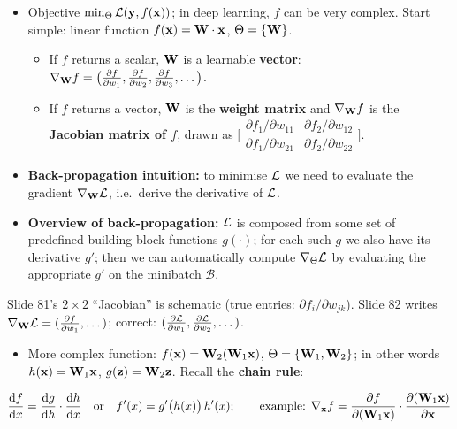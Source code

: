 \begin{itemize}
  \item Objective $\min_\Theta\mathcal{L}(\mathbf{y},f(\mathbf{x}))$; in deep learning, $f$ can be
    very complex. Start simple: linear function $f(\mathbf{x})=\mathbf{W}\cdot\mathbf{x}$,
    $\Theta=\{\mathbf{W}\}$.
    \begin{itemize}
      \item If $f$ returns a scalar, $\mathbf{W}$ is a learnable \textbf{vector}:
        $\nabla_{\mathbf{W}} f=\bigl(\frac{\partial f}{\partial w_1},\frac{\partial f}{\partial w_2},\frac{\partial f}{\partial w_3},\dots\bigr)$.
      \item If $f$ returns a vector, $\mathbf{W}$ is the \textbf{weight matrix} and
        $\nabla_{\mathbf{W}} f$ is the \textbf{Jacobian matrix of $f$}, drawn as
        $\bigl[\begin{smallmatrix}\partial f_1/\partial w_{11} & \partial f_2/\partial w_{12}\\
        \partial f_1/\partial w_{21} & \partial f_2/\partial w_{22}\end{smallmatrix}\bigr]$.
    \end{itemize}
  \item \textbf{Back-propagation intuition:} to minimise $\mathcal{L}$ we need to
    evaluate the gradient $\nabla_{\mathbf{W}}\mathcal{L}$, i.e.\ derive the derivative of
    $\mathcal{L}$.
  \item \textbf{Overview of back-propagation:} $\mathcal{L}$ is composed from some set
    of predefined building block functions $g(\cdot)$; for each such $g$ we also
    have its derivative $g'$; then we can automatically compute
    $\nabla_\Theta\mathcal{L}$ by evaluating the appropriate $g'$ on the minibatch
    $\mathcal{B}$.
\end{itemize}
\begin{caution}
  Slide 81's $2\times2$ ``Jacobian'' is schematic (true entries: $\partial f_i/\partial w_{jk}$).
  Slide 82 writes $\nabla_{\mathbf{W}}\mathcal{L}=(\frac{\partial f}{\partial w_1},\dots)$; correct: $(\frac{\partial\mathcal{L}}{\partial w_1},\frac{\partial\mathcal{L}}{\partial w_2},\dots)$.
\end{caution}
\begin{itemize}
  \item More complex function: $f(\mathbf{x})=\mathbf{W}_2(\mathbf{W}_1\mathbf{x})$,
    $\Theta=\{\mathbf{W}_1,\mathbf{W}_2\}$; in other words $h(\mathbf{x})=\mathbf{W}_1\mathbf{x}$,
    $g(\mathbf{z})=\mathbf{W}_2\mathbf{z}$. Recall the \textbf{chain rule}:
\end{itemize}
\begin{equation}\label{eq:lec03-chain}
  \frac{\mathrm{d}f}{\mathrm{d}x} = \frac{\mathrm{d}g}{\mathrm{d}h}\cdot\frac{\mathrm{d}h}{\mathrm{d}x}
  \quad\text{or}\quad f'(x) = g'\bigl(h(x)\bigr)\,h'(x);
  \qquad\text{example: }
  \nabla_{\mathbf{x}} f = \frac{\partial f}{\partial(\mathbf{W}_1\mathbf{x})}\cdot\frac{\partial(\mathbf{W}_1\mathbf{x})}{\partial\mathbf{x}}
\end{equation}
